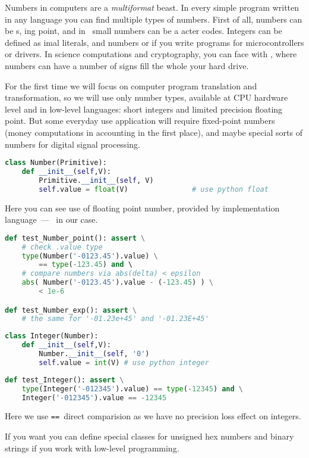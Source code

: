 \clearpage{}

Numbers in computers are a \emph{multiformat} beast. In every simple program
written in any language you can find multiple types of numbers. First of all,
numbers can be s, ing point, and in \cpp\ small
numbers can be a acter codes. Integers can be defined as
imal literals, and  numbers or  if you
write programs for microcontrollers or drivers. In science computations and
cryptography, you can face with , where
numbers can have a number of signs fill the whole your hard drive.

For the first time we will focus on computer program translation and
transformation, so we will use only number types, available at CPU hardware
level and in low-level languages: short integers and limited precision floating
point. But some everyday use application will require fixed-point numbers (money
computations in accounting in the first place), and maybe special sorts of
numbers for digital signal processing.

\begin{lstlisting}[language=Python]
class Number(Primitive):
	def __init__(self,V):
		Primitive.__init__(self, V)
		self.value = float(V)				# use python float
\end{lstlisting}

\noindent
Here you can see use of floating point number, provided by implementation
language\ --- \py\ in our case.

\clearpage
\begin{lstlisting}[language=Python]
def test_Number_point(): assert \
	# check .value type
	type(Number('-0123.45').value) \
		== type(-123.45) and \			
	# compare numbers via abs(delta) < epsilon
	abs( Number('-0123.45').value - (-123.45) ) \
		< 1e-6

def test_Number_exp(): assert \
	# the same for '-01.23e+45' and '-01.23E+45' 
\end{lstlisting}

\clearpage
\begin{lstlisting}[language=Python]
class Integer(Number):
    def __init__(self,V):
        Number.__init__(self, '0')
        self.value = int(V) # use python integer
\end{lstlisting}
\begin{lstlisting}[language=Python]
def test_Integer(): assert \
    type(Integer('-012345').value) == type(-12345) and \
    Integer('-012345').value == -12345
\end{lstlisting}
Here we use \verb|==|\ direct comparision as we have no precision loss effect
on integers.

\bigskip\noindent
If you want you can define special classes for unsigned hex numbers and binary strings if you work with low-level programming.
